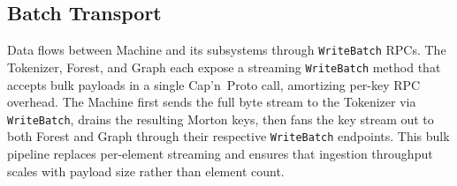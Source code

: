 \subsection{Batch Transport}
\label{sec:batch_transport}

Data flows between Machine and its subsystems through \texttt{WriteBatch}
RPCs.  The Tokenizer, Forest, and Graph each expose a streaming
\texttt{WriteBatch} method that accepts bulk payloads in a single Cap'n~Proto
call, amortizing per-key RPC overhead.  The Machine first sends the full byte
stream to the Tokenizer via \texttt{WriteBatch}, drains the resulting Morton
keys, then fans the key stream out to both Forest and Graph through their
respective \texttt{WriteBatch} endpoints.  This bulk pipeline replaces
per-element streaming and ensures that ingestion throughput scales with
payload size rather than element count.
